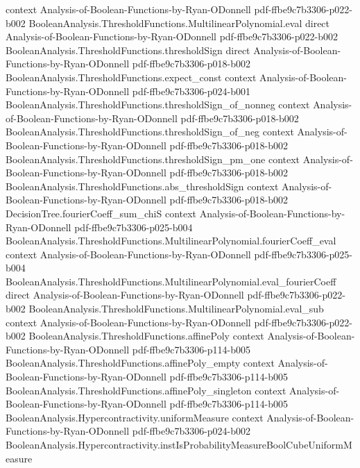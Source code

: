 \begin{lemma}
  {context}
  {Analysis-of-Boolean-Functions-by-Ryan-ODonnell}
  {pdf-ffbe9c7b3306-p022-b002}
\proofstep
  {BooleanAnalysis.ThresholdFunctions.MultilinearPolynomial.eval}
  {direct}
  {Analysis-of-Boolean-Functions-by-Ryan-ODonnell}
  {pdf-ffbe9c7b3306-p022-b002}
\proofstep
  {BooleanAnalysis.ThresholdFunctions.thresholdSign}
  {direct}
  {Analysis-of-Boolean-Functions-by-Ryan-ODonnell}
  {pdf-ffbe9c7b3306-p018-b002}
\proofstep
  {BooleanAnalysis.ThresholdFunctions.expect_const}
  {context}
  {Analysis-of-Boolean-Functions-by-Ryan-ODonnell}
  {pdf-ffbe9c7b3306-p024-b001}
\proofstep
  {BooleanAnalysis.ThresholdFunctions.thresholdSign_of_nonneg}
  {context}
  {Analysis-of-Boolean-Functions-by-Ryan-ODonnell}
  {pdf-ffbe9c7b3306-p018-b002}
\proofstep
  {BooleanAnalysis.ThresholdFunctions.thresholdSign_of_neg}
  {context}
  {Analysis-of-Boolean-Functions-by-Ryan-ODonnell}
  {pdf-ffbe9c7b3306-p018-b002}
\proofstep
  {BooleanAnalysis.ThresholdFunctions.thresholdSign_pm_one}
  {context}
  {Analysis-of-Boolean-Functions-by-Ryan-ODonnell}
  {pdf-ffbe9c7b3306-p018-b002}
\proofstep
  {BooleanAnalysis.ThresholdFunctions.abs_thresholdSign}
  {context}
  {Analysis-of-Boolean-Functions-by-Ryan-ODonnell}
  {pdf-ffbe9c7b3306-p018-b002}
\proofstep
  {DecisionTree.fourierCoeff_sum_chiS}
  {context}
  {Analysis-of-Boolean-Functions-by-Ryan-ODonnell}
  {pdf-ffbe9c7b3306-p025-b004}
\proofstep
  {BooleanAnalysis.ThresholdFunctions.MultilinearPolynomial.fourierCoeff_eval}
  {context}
  {Analysis-of-Boolean-Functions-by-Ryan-ODonnell}
  {pdf-ffbe9c7b3306-p025-b004}
\proofstep
  {BooleanAnalysis.ThresholdFunctions.MultilinearPolynomial.eval_fourierCoeff}
  {direct}
  {Analysis-of-Boolean-Functions-by-Ryan-ODonnell}
  {pdf-ffbe9c7b3306-p022-b002}
\proofstep
  {BooleanAnalysis.ThresholdFunctions.MultilinearPolynomial.eval_sub}
  {context}
  {Analysis-of-Boolean-Functions-by-Ryan-ODonnell}
  {pdf-ffbe9c7b3306-p022-b002}
\proofstep
  {BooleanAnalysis.ThresholdFunctions.affinePoly}
  {context}
  {Analysis-of-Boolean-Functions-by-Ryan-ODonnell}
  {pdf-ffbe9c7b3306-p114-b005}
\proofstep
  {BooleanAnalysis.ThresholdFunctions.affinePoly_empty}
  {context}
  {Analysis-of-Boolean-Functions-by-Ryan-ODonnell}
  {pdf-ffbe9c7b3306-p114-b005}
\proofstep
  {BooleanAnalysis.ThresholdFunctions.affinePoly_singleton}
  {context}
  {Analysis-of-Boolean-Functions-by-Ryan-ODonnell}
  {pdf-ffbe9c7b3306-p114-b005}
\proofstep
  {BooleanAnalysis.Hypercontractivity.uniformMeasure}
  {context}
  {Analysis-of-Boolean-Functions-by-Ryan-ODonnell}
  {pdf-ffbe9c7b3306-p024-b002}
\proofstep
  {BooleanAnalysis.Hypercontractivity.instIsProbabilityMeasureBoolCubeUniformMeasure}

\end{lemma}
